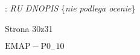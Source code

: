 \documentclass[a4paper,12pt]{article}
\begin{document}
: {\it RU DNOPIS} \{{\it nie podlega ocenie}\}

Strona 30z31

$\mathrm{E}\mathrm{M}\mathrm{A}\mathrm{P}-\mathrm{P}0_{-}10$
\end{document}
